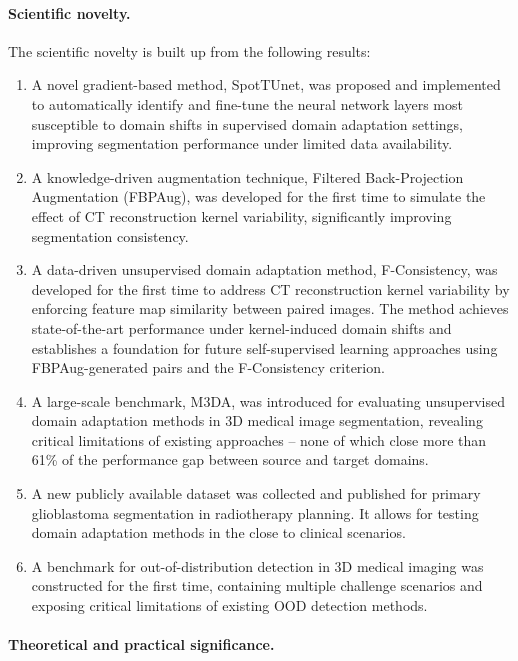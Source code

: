 \paragraph{Scientific novelty.}

The scientific novelty is built up from the following results:

\begin{enumerate}
	\item A novel gradient-based method, SpotTUnet, was proposed and implemented to automatically identify and fine-tune the neural network layers most susceptible to domain shifts in supervised domain adaptation settings, improving segmentation performance under limited data availability.
	\item A knowledge-driven augmentation technique, Filtered Back-Projection Augmentation (FBPAug), was developed for the first time to simulate the effect of CT reconstruction kernel variability, significantly improving segmentation consistency.
	\item A data-driven unsupervised domain adaptation method, F-Consistency, was developed for the first time to address CT reconstruction kernel variability by enforcing feature map similarity between paired images. The method achieves state-of-the-art performance under kernel-induced domain shifts and establishes a foundation for future self-supervised learning approaches using FBPAug-generated pairs and the F-Consistency criterion.
	\item A large-scale benchmark, M3DA, was introduced for evaluating unsupervised domain adaptation methods in 3D medical image segmentation, revealing critical limitations of existing approaches – none of which close more than 61\% of the performance gap between source and target domains.
	\item A new publicly available dataset was collected and published for primary glioblastoma segmentation in radiotherapy planning. It allows for testing domain adaptation methods in the close to clinical scenarios.
	\item A benchmark for out-of-distribution detection in 3D medical imaging was constructed for the first time, containing multiple challenge scenarios and exposing critical limitations of existing OOD detection methods.
\end{enumerate}

\paragraph{Theoretical and practical significance.}

